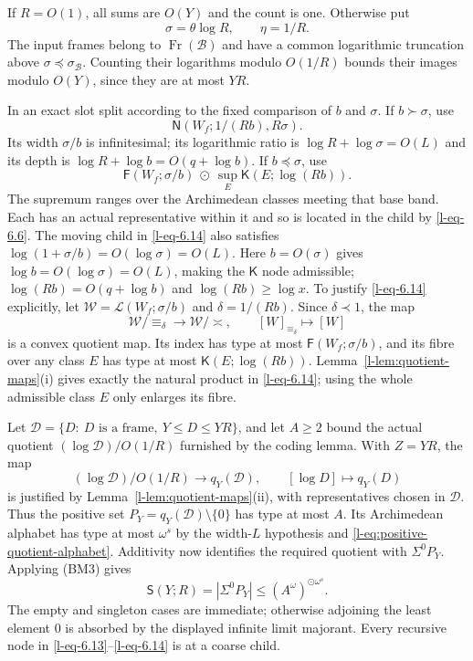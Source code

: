 \documentclass[11pt]{article}
\theoremstyle{definition}
\theoremstyle{remark}
\newcommand{\arch}{\mathrel{\asymp}}
\newcommand{\od}{\mathbin{\odot}}
\newcommand{\Fr}{\operatorname{Fr}}
\newcommand{\NN}{\mathsf N}
\newcommand{\SSS}{\mathsf S}
\newcommand{\KK}{\mathsf K}
\newcommand{\FF}{\mathsf F}
\newcommand{\calB}{\mathcal B}
\newcommand{\calL}{\mathcal L}
\numberwithin{equation}{section}
\begin{document}
If $R=O(1)$, all sums are $O(Y)$ and the count is one.
Otherwise put
\begin{equation}
 \sigma=\theta\log R,\qquad \eta=1/R.
 \label{l-eq-6.12}
\end{equation}
The input frames belong to $\Fr(\calB)$ and have a common logarithmic
truncation above $\sigma\preceq\sigma_{\calB}$.
Counting their logarithms modulo $O(1/R)$ bounds their images modulo
$O(Y)$, since they are at most $YR$.

In an exact slot split according to the fixed comparison of $b$
and $\sigma$.
If $b\succ\sigma$, use
\begin{equation}
 \NN(W_f;1/(Rb),R\sigma).
 \label{l-eq-6.13}
\end{equation}
Its width $\sigma/b$ is infinitesimal; its logarithmic ratio is
$\log R+\log\sigma=O(L)$ and its depth is
$\log R+\log b=O(q+\log b)$.
If $b\preceq\sigma$, use
\begin{equation}
 \FF(W_f;\sigma/b)\ \od\
       \sup_E\KK(E;\log(Rb)).
 \label{l-eq-6.14}
\end{equation}
The supremum ranges over the Archimedean classes meeting that base
band.  Each has an actual representative within it and so is located
in the child by \eqref{l-eq-6.6}.
The moving child in \eqref{l-eq-6.14} also satisfies
$\log(1+\sigma/b)=O(\log\sigma)=O(L)$.
Here $b=O(\sigma)$ gives $\log b=O(\log\sigma)=O(L)$, making
the $\KK$ node admissible; $\log(Rb)=O(q+\log b)$ and
$\log(Rb)\ge\log x$.
To justify \eqref{l-eq-6.14} explicitly, let
$\mathcal W=\calL(W_f;\sigma/b)$ and
$\delta=1/(Rb)$.  Since $\delta\prec1$, the map
\[
 \mathcal W/{\equiv_\delta}\longrightarrow
 \mathcal W/{\arch},\qquad [W]_{\equiv_\delta}\longmapsto[W]
\]
is a convex quotient map.  Its index has type at most
$\FF(W_f;\sigma/b)$, and its fibre over any class $E$ has type
at most $\KK(E;\log(Rb))$.  Lemma~\ref{l-lem:quotient-maps}(i)
gives exactly the natural product in \eqref{l-eq-6.14}; using
the whole admissible class $E$ only enlarges its fibre.

Let $\mathcal D=\{D:\ D\text{ is a frame},\ Y\le D\le YR\}$,
and let $A\ge2$ bound the actual quotient
$(\log\mathcal D)/O(1/R)$ furnished by the coding lemma.
With $Z=YR$, the map
\[
 (\log\mathcal D)/O(1/R)\longrightarrow q_Y(\mathcal D),
 \qquad [\log D]\longmapsto q_Y(D)
\]
is justified by Lemma~\ref{l-lem:quotient-maps}(ii), with
representatives chosen in $\mathcal D$.  Thus the positive
set $P_Y=q_Y(\mathcal D)\setminus\{0\}$ has type at most $A$.
Its Archimedean alphabet has type at most $\omega^s$ by the
width-$L$ hypothesis and \eqref{l-eq:positive-quotient-alphabet}.
Additivity now identifies the required quotient with
$\Sigma^0P_Y$.  Applying (BM3) gives
\begin{equation}
 \SSS(Y;R)=|\Sigma^0P_Y|
       \le(A^\omega)^{\od\omega^s}.
 \label{l-eq-6.15}
\end{equation}
The empty and singleton cases are immediate; otherwise adjoining
the least element $0$ is absorbed by the displayed infinite
limit majorant.  Every recursive node in
\eqref{l-eq-6.13}--\eqref{l-eq-6.14} is at a coarse child.
\end{document}
